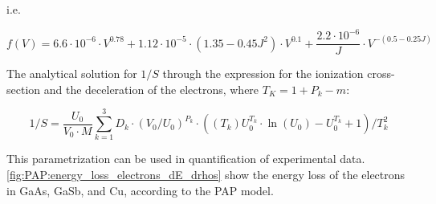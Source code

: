 
i.e.

\begin{equation}
    \label{eq:theory:quantitative:pap:calculation_of_F:dE_d_rho_s:one_over_f_2}
    f(V) = 6.6 \cdot 10^{-6}\cdot V^{0.78} + 1.12\cdot 10^{-5}\cdot (1.35 - 0.45 J^2) \cdot V^{0.1} + \frac{2.2 \cdot 10^{-6}}{J} \cdot V^{-(0.5-0.25J)}
\end{equation}




The analytical solution for $1/S$ through the expression for the ionization cross-section and the deceleration of the electrons, where $ T_K = 1 + P_k - m$:

\begin{equation}
    \label{eq:theory:quantitative:pap:calculation_of_F:dE_d_rho_s:analytical}
    1/S = \frac{U_0}{V_0 \cdot M} \sum \limits_{k=1}^{3} D_k \cdot (V_0/U_0)^{P_k} \cdot ((T_k)U_0^{T_k} \cdot \ln(U_0)-U_0^{T_k}+1)/T_k^2
\end{equation}




This parametrization can be used in quantification of experimental data.
\cref{fig:PAP:energy_loss_electrons_dE_drhos} show the energy loss of the electrons in GaAs, GaSb, and Cu, according to the PAP model.


